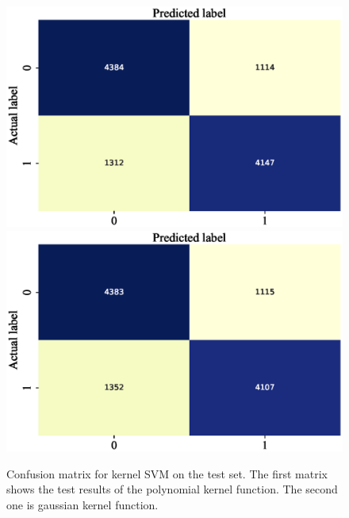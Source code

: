 \documentclass[11pt, a4paper, jou]{apa7}
\begin{document}
\begin{table}[p]
    \centering
    \caption{Classification results of SVM on the test set. }\label{tab:svm_summary}
\end{table}

\begin{figure}[p]
    \centering
    \caption{Confusion matrix for kernel SVM on the test set. The first matrix shows the test results of the polynomial kernel function. The second one is gaussian kernel function. }\label{fig:svm_cm_kernel}
    \includegraphics[width=.45\textwidth]{figures/svm_cm_poly.eps}
    \includegraphics[width=.45\textwidth]{figures/svm_cm_rbf.eps}
\end{figure}
\end{document}
